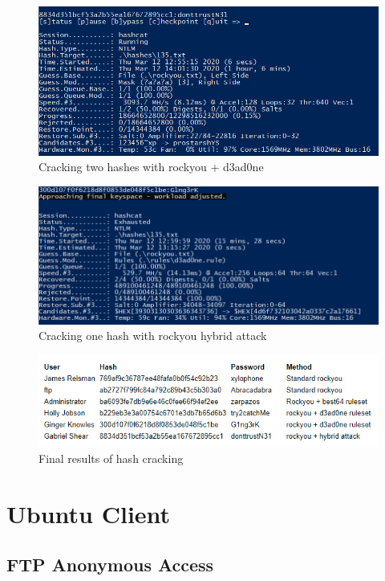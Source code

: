 \documentclass{report}
\begin{document}
\begin{figure}[!htb]
	\centering
	\includegraphics[scale=0.6]{img/hashdump4.png}
	\caption{Cracking two hashes with rockyou + d3ad0ne}
\end{figure}
\begin{figure}[!htb]
	\centering
	\includegraphics[scale=0.6]{img/hashdump5.png}
	\caption{Cracking one hash with rockyou hybrid attack}
\end{figure}
\begin{figure}[!htb]
	\centering
	\includegraphics[scale=0.6]{img/hashdump6.png}
	\caption{Final results of hash cracking}
\end{figure}
\pagebreak



\section{Ubuntu Client}
\subsection{FTP Anonymous Access}
\end{document}
